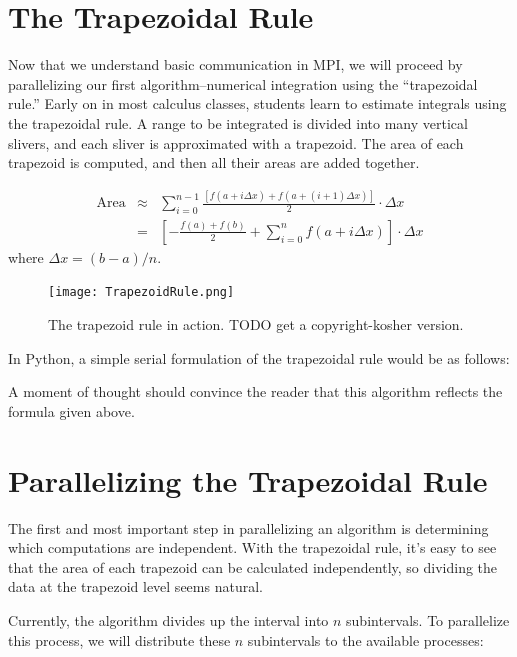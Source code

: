 \section*{The Trapezoidal Rule}
Now that we understand basic communication in MPI, we will proceed by parallelizing our first algorithm--numerical integration using the ``trapezoidal rule.'' Early on in most calculus classes, students learn to estimate integrals using the trapezoidal rule. A range to be integrated is divided into many vertical slivers, and each sliver is approximated with a trapezoid. The area of each trapezoid is computed, and then all their areas are added together.

\begin{eqnarray*}%
\textrm{Area}
&\approx&
\sum_{i=0}^{n-1}\frac{[f(a+i \Delta x)+f(a + (i+1) \Delta x)]}{2}\cdot\Delta x \\
&=&
\left[-\frac{f(a)+f(b)}{2}+\sum_{i=0}^{n}f(a+i\Delta x)\right]\cdot\Delta x
\end{eqnarray*}
where $\Delta x=(b-a)/n$.

\begin{figure}[h]
\centering
\texttt{[image: TrapezoidRule.png]}
\caption{The trapezoid rule in action. TODO get a copyright-kosher version.}
\label{fig:trapezoidal_rule}
\end{figure}

In Python, a simple serial formulation of the trapezoidal rule would be as follows:



A moment of thought should convince the reader that this algorithm reflects the formula given above.

\section*{Parallelizing the Trapezoidal Rule}
The first and most important step in parallelizing an algorithm is determining which computations are independent. With the trapezoidal rule, it's easy to see that the area of each trapezoid can be calculated independently, so dividing the data at the trapezoid level seems natural.

Currently, the algorithm divides up the interval into $n$ subintervals. To parallelize this process, we will distribute these $n$ subintervals to the available processes:

